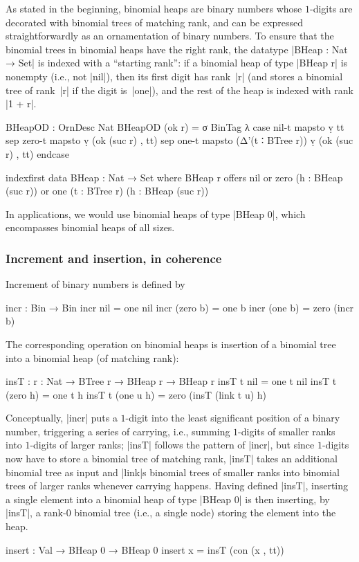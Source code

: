 As stated in the beginning, binomial heaps are binary numbers whose $1$-digits are decorated with binomial trees of matching rank, and can be expressed straightforwardly as an ornamentation of binary numbers.
To ensure that the binomial trees in binomial heaps have the right rank, the datatype |BHeap : Nat → Set| is indexed with a ``starting rank'': if a binomial heap of type |BHeap r| is nonempty (i.e., not |nil|), then its first digit has rank~|r| (and stores a binomial tree of rank~|r| if the digit is~|one|), and the rest of the heap is indexed with rank |1 + r|.
\begin{code}
BHeapOD : OrnDesc Nat
BHeapOD (ok r) = σ BinTag λ  case  nil-t   mapsto  ṿ tt
                             sep   zero-t  mapsto  ṿ (ok (suc r) , tt)
                             sep   one-t   mapsto  (Δ'(t ∶ BTree r)) ṿ (ok (suc r) , tt) endcase

indexfirst data BHeap : Nat → Set where
  BHeap r  offers  nil
           or      zero  (h : BHeap (suc r))
           or      one   (t : BTree r) (h : BHeap (suc r))
\end{code}
In applications, we would use binomial heaps of type |BHeap 0|, which encompasses binomial heaps of all sizes.

\subsubsection{Increment and insertion, in coherence}
Increment of binary numbers is defined by
\begin{code}
incr : Bin → Bin
incr nil        =  one nil
incr (zero  b)  =  one b
incr (one   b)  =  zero (incr b)
\end{code}
The corresponding operation on binomial heaps is insertion of a binomial tree into a binomial heap (of matching rank):
\begin{code}
insT : {r : Nat} → BTree r → BHeap r → BHeap r
insT t nil         = one t nil
insT t (zero   h)  = one t h
insT t (one u  h)  = zero (insT (link t u) h)
\end{code}
Conceptually, |incr| puts a $1$-digit into the least significant position of a binary number, triggering a series of carrying, i.e., summing $1$-digits of smaller ranks into $1$-digits of larger ranks; |insT| follows the pattern of |incr|, but since $1$-digits now have to store a binomial tree of matching rank, |insT| takes an additional binomial tree as input and |link|s binomial trees of smaller ranks into binomial trees of larger ranks whenever carrying happens.
Having defined |insT|, inserting a single element into a binomial heap of type |BHeap 0| is then inserting, by |insT|, a rank-$0$ binomial tree (i.e., a single node) storing the element into the heap.
\begin{code}
insert : Val → BHeap 0 → BHeap 0
insert x = insT (con (x , tt))
\end{code}

